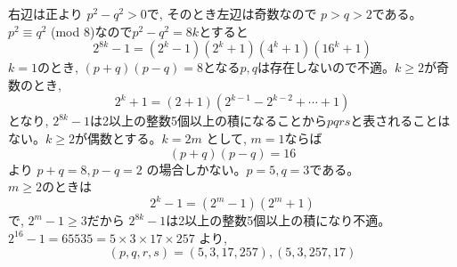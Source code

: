 右辺は正より $p^2-q^2>0$で, そのとき左辺は奇数なので $p>q>2$である。$p^2\equiv q^2$ (mod $8$)なので$p^2-q^2=8k$とすると
\[2^{8k}-1=(2^k-1)(2^k+1)(4^k+1)(16^k+1)\]
$k=1$のとき, $(p+q)(p-q)=8$となる$p,q$は存在しないので不適。$k\geq 2$が奇数のとき, 
\[2^k+1=(2+1)(2^{k-1}-2^{k-2}+\cdots +1)\]
となり, $2^{8k}-1$は2以上の整数5個以上の積になることから$pqrs$と表されることはない。$k\geq 2$が偶数とする。$k=2m$ として, $m=1$ならば 
\[(p+q)(p-q)=16\]
より $p+q=8, p-q=2$ の場合しかない。$p=5, q=3$である。\\
$m\geq 2$のときは
\[2^{k}-1=(2^m-1)(2^m+1)\]
で, $2^{m}-1\geq 3$だから $2^{8k}-1$は2以上の整数5個以上の積になり不適。\\
$2^{16}-1=65535=5\times 3\times 17\times 257$ より,
\[(p,q,r,s)=(5,3,17,257), (5,3,257,17)\]
